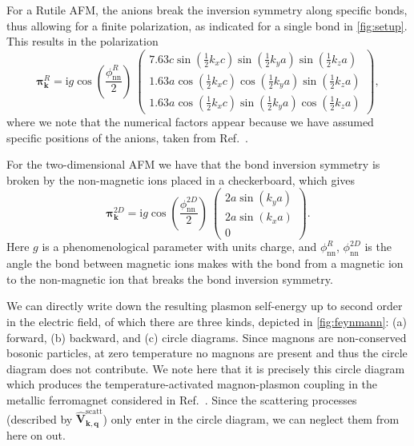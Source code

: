 \documentclass[aps,prb,reprint,twocolumns,superscriptaddress,nofootinbib]{revtex4-2}
\newcommand{\ii}{\mathrm{i}}
\begin{document}
	For a Rutile AFM, the anions break the inversion symmetry along specific bonds, thus allowing for a finite polarization, as indicated for a single bond in \cref{fig:setup}. This results in the polarization
	\begin{equation}
		\bm \pi_{\bm k}^R = \ii g \cos\left(\frac{\phi_{\mathrm{nn}}^R}{2} \right)\ \begin{pmatrix}
			7.63c \sin(\frac12 k_x c) \sin(\frac12 k_y a) \sin(\frac12 k_z a) \\
			1.63a \cos(\frac12 k_x c) \cos(\frac12 k_y a) \sin(\frac12 k_z a)\\
			1.63a \cos(\frac12 k_x c) \sin(\frac12 k_y a) \cos(\frac12 k_z a)
		\end{pmatrix},
		\label{eq:pik-Rutiles}
	\end{equation}
	where we note that the numerical factors appear because we have assumed specific positions of the anions, taken from Ref.~\cite{hainesNeutronDiffractionStudy1997}. 
	
	For the two-dimensional AFM we have that the bond inversion symmetry is broken by the non-magnetic ions placed in a checkerboard, which gives 
	\begin{equation}
		\bm \pi_{\bm k}^{2D} = \ii g \cos\left(\frac{\phi_{\mathrm{nn}}^{2D}}{2}\right)\ \begin{pmatrix}
			2a\sin( k_y a) \\
			2a\sin(k_x a) \\ 
			0
		\end{pmatrix}.
		\label{eq:pik-cuprates}
	\end{equation}
	Here $g$ is a phenomenological parameter with units charge, and $\phi_{\mathrm{nn}}^{R}$, $\phi_{\mathrm{nn}}^{2D}$  is the angle the bond between magnetic ions makes with the bond from a magnetic ion to the non-magnetic ion that breaks the bond inversion symmetry. 
	
	
	We can directly write down the resulting plasmon self-energy \cite{stoofUltracoldQuantumFields2009} up to second order in the electric field, of which there are three kinds, depicted in \cref{fig:feynmann}: (a) forward, (b) backward, and (c) circle diagrams. Since magnons are non-conserved bosonic particles, at zero temperature no magnons are present and thus the circle diagram does not contribute. We note here that it is precisely this circle diagram which produces the temperature-activated magnon-plasmon coupling in the metallic ferromagnet considered in Ref.~\cite{ghoshPlasmonmagnonInteractionsTwodimensional2023}. Since the scattering processes (described by $\hat{\bm V}_{\bm k,\bm q}^{\mathrm{scatt}}$) only enter in the circle diagram, we can neglect them from here on out. 
	
\end{document}
